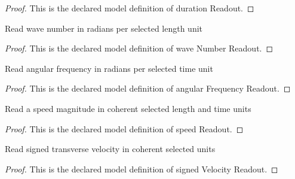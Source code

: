 \begin{proof}
  This is the declared model definition of duration Readout.
\end{proof}
\begin{definition}
  \label{def:physics:phyx-mini-0305:phyxminiproblems-problemphyxmini0305-wavenumberreadout}
  Read wave number in radians per selected length unit
\end{definition}
\begin{proof}
  This is the declared model definition of wave Number Readout.
\end{proof}
\begin{definition}
  \label{def:physics:phyx-mini-0305:phyxminiproblems-problemphyxmini0305-angularfrequencyreadout}
  Read angular frequency in radians per selected time unit
\end{definition}
\begin{proof}
  This is the declared model definition of angular Frequency Readout.
\end{proof}
\begin{definition}
  \label{def:physics:phyx-mini-0305:phyxminiproblems-problemphyxmini0305-speedreadout}
  Read a speed magnitude in coherent selected length and time units
\end{definition}
\begin{proof}
  This is the declared model definition of speed Readout.
\end{proof}
\begin{definition}
  \label{def:physics:phyx-mini-0305:phyxminiproblems-problemphyxmini0305-signedvelocityreadout}
  Read signed transverse velocity in coherent selected units
\end{definition}
\begin{proof}
  This is the declared model definition of signed Velocity Readout.
\end{proof}
